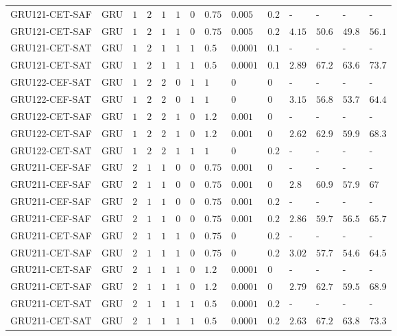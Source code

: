 \begin{table}[tbp]
\begin{tabular}{llllllllllllll}
GRU121-CET-SAF & GRU & $1$ & $2$ & $1$ & $1$ & $0$ & $0.75$ & $0.005$ & $0.2$ & - & - & - & - \\
GRU121-CET-SAF & GRU & $1$ & $2$ & $1$ & $1$ & $0$ & $0.75$ & $0.005$ & $0.2$ & $4.15$ & $50.6$ & $49.8$ & $56.1$ \\
GRU121-CET-SAT & GRU & $1$ & $2$ & $1$ & $1$ & $1$ & $0.5$ & $0.0001$ & $0.1$ & - & - & - & - \\
GRU121-CET-SAT & GRU & $1$ & $2$ & $1$ & $1$ & $1$ & $0.5$ & $0.0001$ & $0.1$ & $2.89$ & $67.2$ & $63.6$ & $73.7$ \\
GRU122-CEF-SAT & GRU & $1$ & $2$ & $2$ & $0$ & $1$ & $1$ & $0$ & $0$ & - & - & - & - \\
GRU122-CEF-SAT & GRU & $1$ & $2$ & $2$ & $0$ & $1$ & $1$ & $0$ & $0$ & $3.15$ & $56.8$ & $53.7$ & $64.4$ \\
GRU122-CET-SAF & GRU & $1$ & $2$ & $2$ & $1$ & $0$ & $1.2$ & $0.001$ & $0$ & - & - & - & - \\
GRU122-CET-SAF & GRU & $1$ & $2$ & $2$ & $1$ & $0$ & $1.2$ & $0.001$ & $0$ & $2.62$ & $62.9$ & $59.9$ & $68.3$ \\
GRU122-CET-SAT & GRU & $1$ & $2$ & $2$ & $1$ & $1$ & $1$ & $0$ & $0.2$ & - & - & - & - \\
GRU211-CEF-SAF & GRU & $2$ & $1$ & $1$ & $0$ & $0$ & $0.75$ & $0.001$ & $0$ & - & - & - & - \\
GRU211-CEF-SAF & GRU & $2$ & $1$ & $1$ & $0$ & $0$ & $0.75$ & $0.001$ & $0$ & $2.8$ & $60.9$ & $57.9$ & $67$ \\
GRU211-CEF-SAF & GRU & $2$ & $1$ & $1$ & $0$ & $0$ & $0.75$ & $0.001$ & $0.2$ & - & - & - & - \\
GRU211-CEF-SAF & GRU & $2$ & $1$ & $1$ & $0$ & $0$ & $0.75$ & $0.001$ & $0.2$ & $2.86$ & $59.7$ & $56.5$ & $65.7$ \\
GRU211-CET-SAF & GRU & $2$ & $1$ & $1$ & $1$ & $0$ & $0.75$ & $0$ & $0.2$ & - & - & - & - \\
GRU211-CET-SAF & GRU & $2$ & $1$ & $1$ & $1$ & $0$ & $0.75$ & $0$ & $0.2$ & $3.02$ & $57.7$ & $54.6$ & $64.5$ \\
GRU211-CET-SAF & GRU & $2$ & $1$ & $1$ & $1$ & $0$ & $1.2$ & $0.0001$ & $0$ & - & - & - & - \\
GRU211-CET-SAF & GRU & $2$ & $1$ & $1$ & $1$ & $0$ & $1.2$ & $0.0001$ & $0$ & $2.79$ & $62.7$ & $59.5$ & $68.9$ \\
GRU211-CET-SAT & GRU & $2$ & $1$ & $1$ & $1$ & $1$ & $0.5$ & $0.0001$ & $0.2$ & - & - & - & - \\
GRU211-CET-SAT & GRU & $2$ & $1$ & $1$ & $1$ & $1$ & $0.5$ & $0.0001$ & $0.2$ & $2.63$ & $67.2$ & $63.8$ & $73.3$ \\

\end{tabular}
\end{table}
